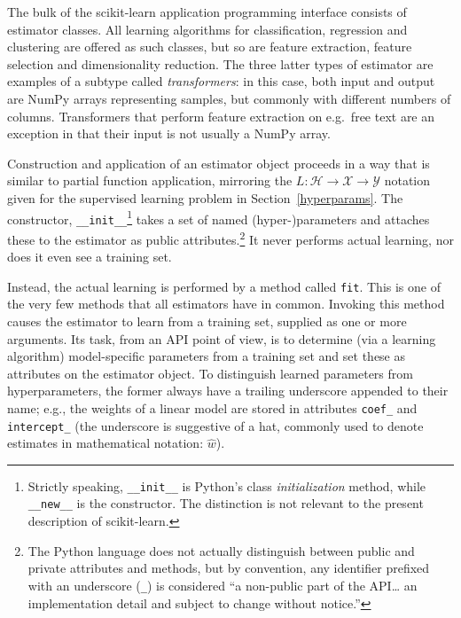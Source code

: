 \documentclass[a4paper,twocolumn]{article}
\begin{document}

The bulk of the scikit-learn application programming interface
consists of estimator classes.
All learning algorithms for classification, regression and clustering
are offered as such classes,
but so are feature extraction, feature selection and dimensionality reduction.
The three latter types of estimator are examples of a subtype
called \textit{transformers}:
in this case, both input and output are NumPy arrays representing samples,
but commonly with different numbers of columns.
Transformers that perform feature extraction on e.g.\ free text
are an exception in that their input is not usually a NumPy array.

Construction and application of an estimator object
proceeds in a way that is similar to partial function application,
mirroring the $L : \mathcal{H} \to \mathcal{X} \to \mathcal{Y}$ notation
given for the supervised learning problem in Section~\ref{hyperparams}.
The constructor, \texttt{\_\_init\_\_}\footnote{
  Strictly speaking, \texttt{\_\_init\_\_} is Python's
  class \textit{initialization} method,
  while \texttt{\_\_new\_\_} is the constructor.
  The distinction is not relevant to the present description of scikit-learn.}
takes a set of named (hyper-)parameters
and attaches these to the estimator as public attributes.\footnote{
  The Python language does not actually distinguish between public and private
  attributes and methods,
  but by convention, any identifier prefixed with an underscore (\texttt{\_})
  is considered ``a non-public part of the API\ldots
  an implementation detail and subject to change without notice.''
  }
It never performs actual learning, nor does it even see a training set.

Instead, the actual learning is performed by a method called \texttt{fit}.
This is one of the very few methods that all estimators have in common.
Invoking this method causes the estimator to learn from a training set,
supplied as one or more arguments.
Its task, from an API point of view,
is to determine (via a learning algorithm) model-specific parameters
from a training set and set these as attributes on the estimator object.
To distinguish learned parameters from hyperparameters,
the former always have a trailing underscore appended to their name;
e.g., the weights of a linear model are stored in attributes
\texttt{coef\_} and \texttt{intercept\_}
(the underscore is suggestive of a hat,
commonly used to denote estimates in mathematical notation: $\hat{w}$).
\end{document}
